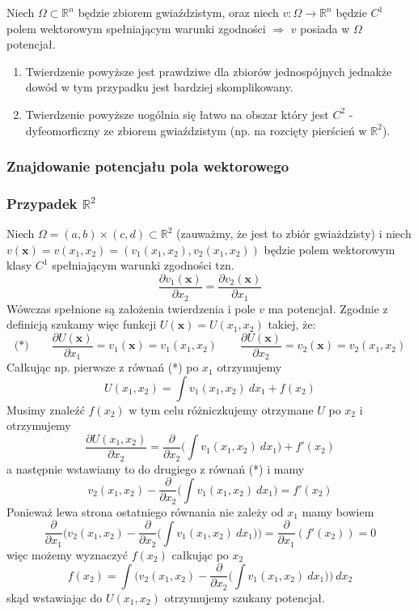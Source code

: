 \begin{tw}
	Niech $\Omega\subset\mathbb{R}^{n}$ będzie zbiorem gwiaździstym, oraz niech $v:\Omega\rightarrow \mathbb{R}^{n}$ będzie $C^{1}$ polem wektorowym spełniającym warunki zgodności $\Rightarrow$ $v$ posiada w $\Omega$ potencjał.
\end{tw}

\begin{uwg}
	\begin{enumerate}
		\item
		Twierdzenie powyższe jest prawdziwe dla zbiorów jednospójnych jednakże dowód w tym przypadku jest bardziej skomplikowany.
		\item
		Twierdzenie powyższe uogólnia się łatwo na obszar który jest $C^{2}$ - dyfeomorficzny ze zbiorem gwiaździstym (np. na rozcięty pierścień w $\mathbb{R}^{2}$).
	\end{enumerate}
\end{uwg}

\subsubsection{Znajdowanie potencjału pola wektorowego}

\subsubsection*{Przypadek $\mathbb{R}^{2}$}

Niech $\Omega=(a,b)\times(c,d)\subset\mathbb{R}^{2}$ (zauważmy, że jest to zbiór gwiażdzisty) i niech $v(\mathbf{x})=v(x_{1},x_{2})=(v_{1}(x_{1},x_{2}),v_{2}(x_{1},x_{2}))$ będzie polem wektorowym klasy $C^{1}$ spełniającym warunki zgodności tzn. $$\frac{\partial v_{1}(\mathbf{x})}{\partial x_{2}}=\frac{\partial v_{2}(\mathbf{x})}{\partial x_{1}}$$
Wówczas spełnione są założenia twierdzenia i pole $v$ ma potencjał. Zgodnie z definicją szukamy więc funkcji $U(\mathbf{x})=U(x_{1},x_{2})$ takiej, że:
$$\textrm{(*)}\qquad\frac{\partial U(\mathbf{x})}{\partial x_{1}}=v_{1}(\mathbf{x})=v_{1}(x_{1},x_{2})\qquad \frac{\partial U(\mathbf{x})}{\partial x_{2}}=v_{2}(\mathbf{x})=v_{2}(x_{1},x_{2})$$
Całkując np. pierwsze z równań (*) po $x_{1}$ otrzymujemy
$$U(x_{1},x_{2})=\int v_{1}(x_{1},x_{2})\ dx_{1}+f(x_{2})$$
Musimy znaleźć $f(x_{2})$ w tym celu różniczkujemy otrzymane $U$ po $x_{2}$ i otrzymujemy
$$\frac{\partial U(x_{1},x_{2})}{\partial x_{2}}=\frac{\partial}{\partial x_{2}}\Big(\int v_{1}(x_{1},x_{2})\ dx_{1}\Big)+f'(x_{2})$$
a następnie wstawiamy to do drugiego z równań (*) i mamy
$$v_{2}(x_{1},x_{2})-\frac{\partial}{\partial x_{2}}\Big(\int v_{1}(x_{1},x_{2})\ dx_{1}\Big)=f'(x_{2})$$
Ponieważ lewa strona ostatniego równania nie zależy od $x_{1}$ mamy bowiem
$$\frac{\partial}{\partial x_{1}}\Big(v_{2}(x_{1},x_{2})-\frac{\partial}{\partial x_{2}}\Big(\int v_{1}(x_{1},x_{2})\ dx_{1}\Big)\Big)=\frac{\partial}{\partial x_{1}}(f'(x_{2}))=0$$
więc możemy wyznaczyć $f(x_{2})$ całkując po $x_{2}$
$$f(x_{2})=\int \Big(v_{2}(x_{1},x_{2})-\frac{\partial}{\partial x_{2}}\Big(\int v_{1}(x_{1},x_{2})\ dx_{1}\Big)\Big)\ dx_{2}$$
skąd wstawiając do $U(x_{1},x_{2})$ otrzymujemy szukany potencjał.

